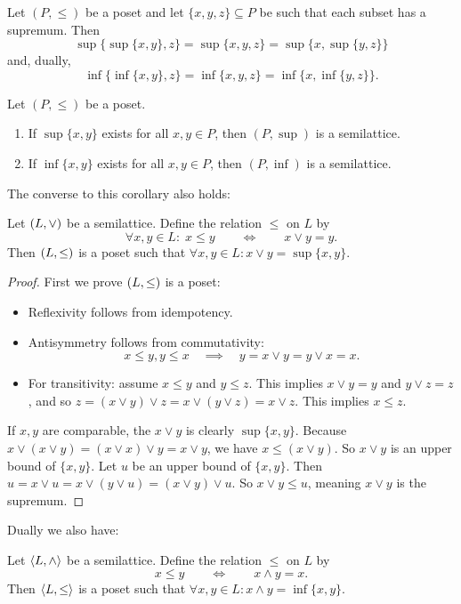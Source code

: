 \begin{proposition}
Let $(P,\leq)$ be a poset and let $\{x,y,z\}\subseteq P$ be such that each subset has a supremum. Then
\[ \sup\{\sup\{x,y\},z\} = \sup\{x,y,z\} = \sup\{x,\sup\{y,z\}\} \]
and, dually,
\[ \inf\{\inf\{x,y\},z\} = \inf\{x,y,z\} = \inf\{x,\inf\{y,z\}\}. \]
\end{proposition}
\begin{corollary}
Let $(P,\leq)$ be a poset.
\begin{enumerate}
\item If $\sup\{x,y\}$ exists for all $x,y\in P$, then $(P,\sup)$ is a semilattice.
\item If $\inf\{x,y\}$ exists for all $x,y\in P$, then $(P,\inf)$ is a semilattice.
\end{enumerate}
\end{corollary}
The converse to this corollary also holds:
\begin{proposition} \label{orderSemilattice}
Let $\left( L,\vee \right)$ be a semilattice. Define the relation $\leq$ on $L$ by
\[ \forall x,y\in L:\; x\leq y \qquad \iff \qquad x\vee y = y. \]
Then $\left( L,\leq \right)$ is a poset such that $\forall x,y\in L: x\vee y = \sup\{x,y\}$.
\end{proposition}
\begin{proof}
First we prove $\left( L,\leq \right)$ is a poset:
\begin{itemize}
\item Reflexivity follows from idempotency.
\item Antisymmetry follows from commutativity:
\[ x\leq y, y\leq x \quad\implies\quad y = x\vee y = y \vee x = x. \]
\item For transitivity: assume $x\leq y$ and $y\leq z$. This implies $x\vee y = y$ and $y\vee z = z$, and so $z = (x\vee y)\vee z =x\vee (y\vee z) =x\vee z$. This implies $x\leq z$.
\end{itemize}
If $x,y$ are comparable, the $x \vee y$ is clearly $\sup\{x,y\}$. Because $x\vee(x\vee y) = (x\vee x)\vee y = x\vee y$, we have $x\leq (x\vee y)$. So $x\vee y$ is an upper bound of $\{x,y\}$. Let $u$ be an upper bound of $\{x,y\}$. Then $u = x\vee u = x\vee (y\vee u) = (x\vee y)\vee u$. So $x\vee y \leq u$, meaning $x\vee y$ is the supremum.
\end{proof}
Dually we also have:
\begin{corollary}
Let $\langle L,\wedge \rangle$ be a semilattice. Define the relation $\leq$ on $L$ by
\[ x\leq y \qquad \iff \qquad x\wedge y = x. \]
Then $\langle L,\leq \rangle$ is a poset such that $\forall x,y\in L: x\wedge y = \inf\{x,y\}$.
\end{corollary}

